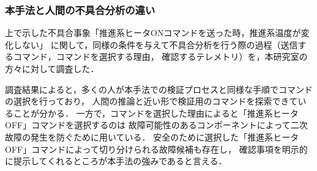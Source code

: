 \documentclass[11pt]{jsarticle}%
\begin{document}
\begin{multicols}{2}
\subsubsection{本手法と人間の不具合分析の違い}
上で示した不具合事象「推進系ヒータONコマンドを送った時，推進系温度が変化しない」
に関して，同様の条件を与えて不具合分析を行う際の過程（送信するコマンド，コマンドを選択する理由，
確認するテレメトリ）を，本研究室の方々に対して調査した．%

調査結果によると，多くの人が本手法での検証プロセスと同様な手順でコマンドの選択を行っており，
人間の推論と近い形で検証用のコマンドを探索できていることが分かる．
一方で，コマンドを選択した理由によると「推進系ヒータOFF」コマンドを選択するのは
故障可能性のあるコンポーネントによって二次故障の発生を防ぐために用いている．
安全のために選択した「推進系ヒータOFF」コマンドによって切り分けられる故障候補も存在し，
確認事項を明示的に提示してくれるところが本手法の強みであると言える．
\vspace{-1zh}

\end{multicols}
\end{document}
